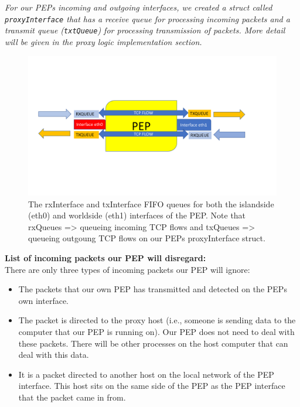 \emph{For our PEPs incoming and outgoing interfaces, we created a struct called {\tt proxyInterface} that has a receive queue for processing incoming packets and a transmit queue ({\tt txtQueue}) for processing transmission of packets.  More detail will be given in the proxy logic implementation section.} \\
 \begin{figure}[h!]
    \centering
    \includegraphics[width=1.0\textwidth]{PEPInterfaces.pdf}
    \caption{The rxInterface and txInterface FIFO queues for both the islandside (eth0) and worldside (eth1) interfaces of the PEP. Note that rxQueues => queueing incoming TCP flows and txQueues => queueing outgoung TCP flows on our PEPs proxyInterface struct.\\}
    \label{PEPInterfaces}
\end{figure}

\noindent \textbf{List of incoming packets our PEP will disregard:}\\
 
There are only three types of incoming packets our PEP will ignore:\\
\begin{itemize}
\item The packets that our own PEP has transmitted and detected on the PEPs  own interface.
\item The packet is directed to the proxy host (i.e., someone is sending data to the computer that our PEP is running on). Our PEP does not need to deal with these packets. There will be other processes on the host computer that can deal with this data.
\item It is a packet directed to another host on the local network of the PEP interface. This host sits on the same side of the PEP as the PEP interface that the packet came in from. \\
\end{itemize}

